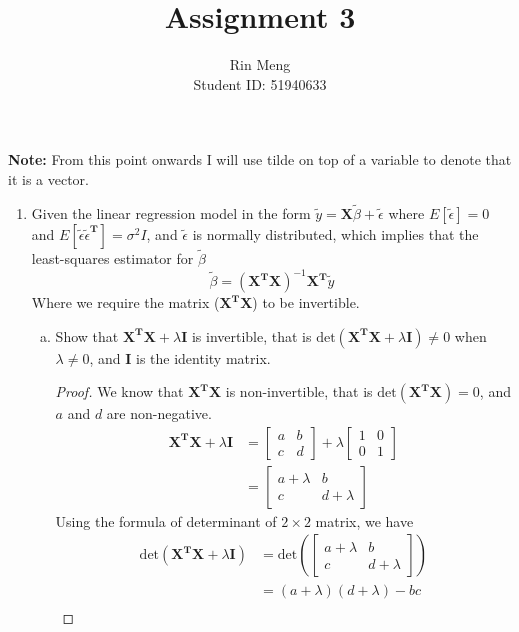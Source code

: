 \documentclass[12pt]{article}
\title{Assignment 3}
\author{Rin Meng \\ Student ID: 51940633}
\newcommand{\ytilde}{\tilde{y}}
\newcommand{\X}{\mathbf{X}}
\newcommand{\btilde}{\tilde{\beta}}
\newcommand{\etilde}{\tilde{\epsilon}}
\newcommand{\lm}{\ytilde = \X\btilde + \etilde}
\newcommand{\exE}{E[\etilde]}
\newcommand{\etet}{E[\etilde\etilde^{\T}]}
\newcommand{\btildematrix}{(\X^{\T}\X)^{-1}\X^{\T} \ytilde}
\newcommand{\xtx}{\X^{\T}\X}
\newcommand{\I}{\mathbf{I}}
\newcommand{\T}{\mathbf{T}}
\begin{document}
\maketitle
\textbf{Note:} From this point onwards I will use tilde on top of a variable to denote that it is a vector.
    \begin{enumerate}[1.]
        \item Given the linear regression model in the form $\lm$ where $\exE = 0$ and $\etet = \sigma^2I$, and $\etilde$ is 
        normally distributed, which implies that the least-squares estimator for $\btilde$
        \[\btilde = \btildematrix\]
        Where we require the matrix ($\xtx$) to be invertible.
            \begin{enumerate}[a)]
                \item Show that $\xtx + \lambda \I$ is invertible, that is $\text{det}(\xtx + \lambda \I) \neq 0$ 
                when $\lambda \neq 0$, and $\I$ is the identity matrix.
                \begin{proof}
                    We know that $\xtx$ is non-invertible, that is $\text{det}(\xtx) = 0$, and $a$ and $d$ are non-negative.
                    \begin{align*}
                        \xtx + \lambda \I &=  \begin{bmatrix} a & b \\ c & d \end{bmatrix} + 
                        \lambda \begin{bmatrix} 1 & 0 \\ 0 & 1 \end{bmatrix} \\
                        &= \begin{bmatrix} a + \lambda & b \\ c & d + \lambda \end{bmatrix}
                    \end{align*}
                    Using the formula of determinant of $2 \times 2$ matrix, we have
                    \begin{align*}
                        \text{det}(\xtx + \lambda \I) &= \text{det}\left(
                            \begin{bmatrix} a + \lambda & b \\ c & d + \lambda \end{bmatrix}\right) \\
                        &= (a + \lambda)(d + \lambda) - bc \\

\end{align*}
\end{proof}
\end{enumerate}
\end{enumerate}
\end{document}
